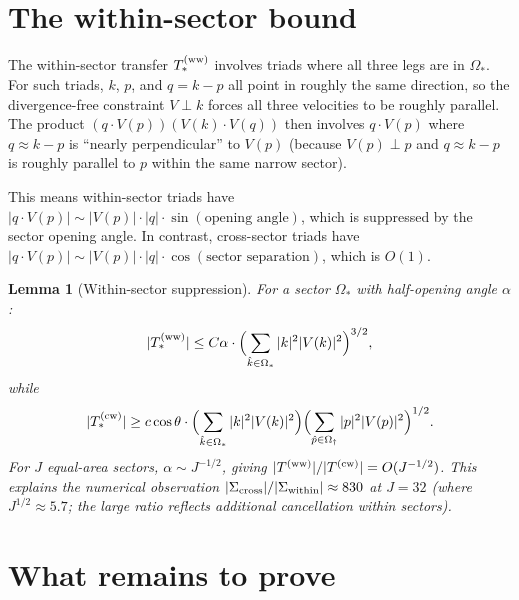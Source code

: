 \documentclass[11pt]{article}
\newtheorem{lemma}[theorem]{Lemma}
\theoremstyle{definition}
\begin{document}
\section{The within-sector bound}

The within-sector transfer $T_*^{(\rm ww)}$
involves triads where all three legs are in
$\Omega_*$.  For such triads, $k$, $p$, and
$q=k-p$ all point in roughly the same
direction, so the divergence-free constraint
$V\perp k$ forces all three velocities to be
roughly parallel.  The product
$(q\cdot V(p))(V(k)\cdot V(q))$ then involves
$q\cdot V(p)$ where $q\approx k-p$ is
``nearly perpendicular'' to $V(p)$ (because
$V(p)\perp p$ and $q\approx k-p$ is roughly
parallel to $p$ within the same narrow sector).

This means within-sector triads have
$|q\cdot V(p)| \sim |V(p)|\cdot|q|\cdot
\sin(\text{opening angle})$,
which is suppressed by the sector opening
angle.  In contrast, cross-sector triads have
$|q\cdot V(p)| \sim |V(p)|\cdot|q|\cdot
\cos(\text{sector separation})$,
which is $O(1)$.

\begin{lemma}[Within-sector suppression]
\label{lem:within}
For a sector $\Omega_*$ with half-opening
angle $\alpha$:
\begin{equation}
|T_*^{(\rm ww)}| \leq C\alpha\cdot
\Bigl(\sum_{\hat k\in\Omega_*}
|k|^2|V(k)|^2\Bigr)^{3/2},
\end{equation}
while
\begin{equation}
|T_*^{(\rm cw)}| \geq c\cos\theta\cdot
\Bigl(\sum_{\hat k\in\Omega_*}
|k|^2|V(k)|^2\Bigr)
\Bigl(\sum_{\hat p\in\Omega_\dagger}
|p|^2|V(p)|^2\Bigr)^{1/2}.
\end{equation}
For $J$ equal-area sectors, $\alpha\sim
J^{-1/2}$, giving
$|T^{(\rm ww)}|/|T^{(\rm cw)}| = O(J^{-1/2})$.
This explains the numerical observation
$|\Sigma_{\rm cross}|/|\Sigma_{\rm within}|
\approx 830$ at $J=32$ (where
$J^{1/2}\approx 5.7$; the large ratio
reflects additional cancellation within
sectors).
\end{lemma}


\section{What remains to prove}
\end{document}
